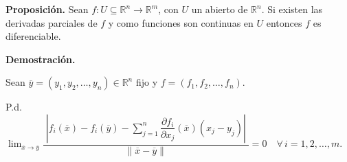 \documentclass[fleqn]{article}
\begin{document}
	\textbf{Proposición.} Sean $ f: U \subseteq \mathbb{R}^n \to \mathbb{R}^m $, con $ U $ un abierto de $ \mathbb{R}^n $. Si existen las derivadas parciales de $ f $ y como funciones son continuas en $ U $ entonces $ f $ es diferenciable.

	\textbf{Demostración.}

	Sean $ \overline{y} = \left( y_1, y_2, \ldots, y_n \right) \in \mathbb{R}^n $ fijo y $ f = \left( f_1, f_2, \ldots, f_n \right) $.

	P.d. $ \displaystyle \lim_{\overline{x} \to \overline{y}} \dfrac{ \phantom{|} \left\lvert f_i(\overline{x}) - f_i(\overline{y}) - \displaystyle \sum_{j=1}^{n} \dfrac{ \partial f_i }{ \partial x_j } (\overline{x}) \left( x_j - y_j \right) \right\rvert \phantom{|} }{ \left\lVert \overline{x} - \overline{y} \right\rVert } = 0 \quad \forall \, i = 1, 2, \ldots, m $.
\end{document}
